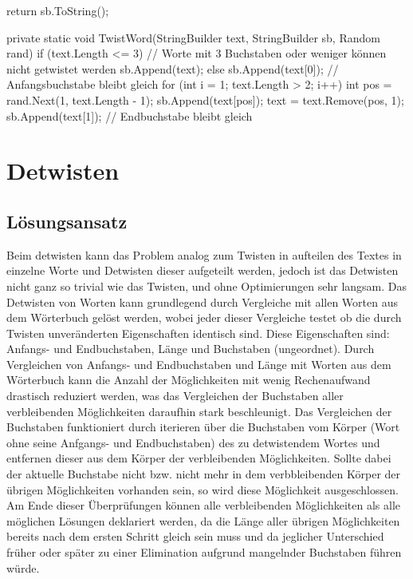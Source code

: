 \documentclass{article}
\begin{document}
\begin{flushleft}
\begin{Csharp}
{    return sb.ToString();
}

private static void TwistWord(StringBuilder text, StringBuilder sb, Random rand)
{
    if (text.Length <= 3) 
    	// Worte mit 3 Buchstaben oder weniger können nicht getwistet werden
    {
        sb.Append(text);
    }
    else
    {
        sb.Append(text[0]); // Anfangsbuchstabe bleibt gleich
        for (int i = 1; text.Length > 2; i++)
        {
            int pos = rand.Next(1, text.Length - 1);
            sb.Append(text[pos]);
            text = text.Remove(pos, 1);
        }
        sb.Append(text[1]); // Endbuchstabe bleibt gleich
    }
}
\end{Csharp}

\newpage
\section{Detwisten}

\subsection{Lösungsansatz}
Beim detwisten kann das Problem analog zum Twisten in aufteilen des Textes in einzelne Worte und Detwisten dieser aufgeteilt werden, jedoch ist das Detwisten nicht ganz so trivial wie das Twisten, und ohne Optimierungen sehr langsam.
Das Detwisten von Worten kann grundlegend durch Vergleiche mit allen Worten aus dem Wörterbuch gelöst werden, wobei jeder dieser Vergleiche testet ob die durch Twisten unveränderten Eigenschaften identisch sind. Diese Eigenschaften sind: Anfangs- und Endbuchstaben, Länge und Buchstaben (ungeordnet).
Durch Vergleichen von Anfangs- und Endbuchstaben und Länge mit Worten aus dem Wörterbuch kann die Anzahl der Möglichkeiten mit wenig Rechenaufwand drastisch reduziert werden, was das Vergleichen der Buchstaben aller verbleibenden Möglichkeiten daraufhin stark beschleunigt.
Das Vergleichen der Buchstaben funktioniert durch iterieren über die Buchstaben vom Körper (Wort ohne seine Anfgangs- und Endbuchstaben) des zu detwistendem Wortes und entfernen dieser aus dem Körper der verbleibenden Möglichkeiten. Sollte dabei der aktuelle Buchstabe nicht bzw. nicht mehr in dem verbbleibenden Körper der übrigen Möglichkeiten vorhanden sein, so wird diese Möglichkeit ausgeschlossen.
Am Ende dieser Überprüfungen können alle verbleibenden Möglichkeiten als alle möglichen Lösungen deklariert werden, da die Länge aller übrigen Möglichkeiten bereits nach dem ersten Schritt gleich sein muss und da jeglicher Unterschied früher oder später zu einer Elimination aufgrund mangelnder Buchstaben führen würde.


\end{flushleft}
\end{document}
